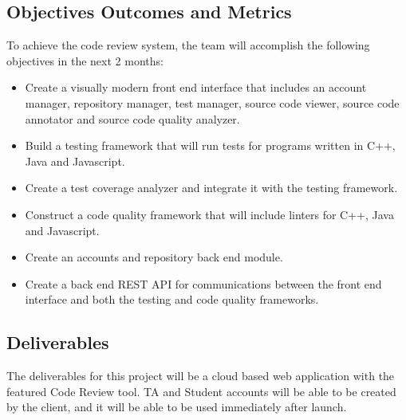 
\subsection{Objectives Outcomes and Metrics}
To achieve the code review system, the team will accomplish the following
objectives in the next 2 months:

\begin{itemize}
\item Create a visually modern front end interface that includes an account manager,
repository manager, test manager, source code viewer, source code annotator and
source code quality analyzer.
\item Build a testing framework that will run tests for programs written in
C++, Java and Javascript.
\item Create a test coverage analyzer and integrate it with the testing
framework.
\item Construct a code quality framework that will include linters for C++,
Java and Javascript.
\item Create an accounts and repository back end module.
\item Create a back end REST API for communications between the front end interface
and both the testing and code quality frameworks.

\end{itemize}
\subsection{Deliverables}

The deliverables for this project will be a cloud based web application with the
featured Code Review tool. TA and Student accounts will be able to be created by
the client, and it will be able to be used immediately after launch.
